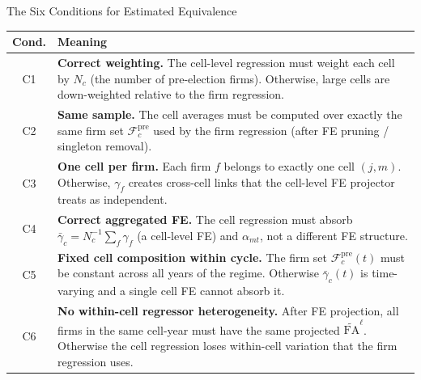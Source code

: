 \documentclass[aspectratio=169,11pt]{beamer}
\newcommand{\FA}{\mathrm{FA}}
\newcommand{\cFpre}{\mathcal{F}^{\mathrm{pre}}}
\begin{document}
\begin{frame}{The Six Conditions for Estimated Equivalence}

\scriptsize
\renewcommand{\arraystretch}{1.35}
\begin{center}
\begin{tabular}{c p{9.5cm}}
\toprule
\textbf{Cond.} & \textbf{Meaning} \\
\midrule
C1 & \textbf{Correct weighting.}\; The cell-level regression must weight each cell by $N_c$ (the number of pre-election firms). Otherwise, large cells are down-weighted relative to the firm regression. \\
C2 & \textbf{Same sample.}\; The cell averages must be computed over exactly the same firm set $\cFpre_c$ used by the firm regression (after FE pruning / singleton removal). \\
C3 & \textbf{One cell per firm.}\; Each firm $f$ belongs to exactly one cell $(j, m)$. Otherwise, $\gamma_f$ creates cross-cell links that the cell-level FE projector treats as independent. \\
C4 & \textbf{Correct aggregated FE.}\; The cell regression must absorb $\bar\gamma_c = N_c^{-1}\sum_f \gamma_f$ (a cell-level FE) and $\alpha_{mt}$, not a different FE structure. \\
C5 & \textbf{Fixed cell composition within cycle.}\; The firm set $\cFpre_c(t)$ must be constant across all years of the regime. Otherwise $\bar\gamma_c(t)$ is time-varying and a single cell FE cannot absorb it. \\
C6 & \textbf{No within-cell regressor heterogeneity.}\; After FE projection, all firms in the same cell-year must have the same projected $\widetilde{\FA}^\ell$. Otherwise the cell regression loses within-cell variation that the firm regression uses. \\
\bottomrule
\end{tabular}
\end{center}

\end{frame}
\end{document}
